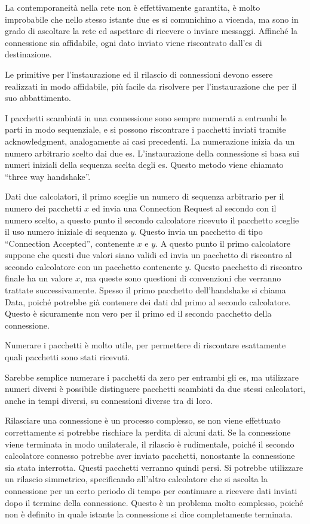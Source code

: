 \documentclass{article}
\numberwithin{equation}{subsection}
\begin{document}
La contemporaneità nella rete non è effettivamente garantita, è molto improbabile che  nello stesso istante due es si comunichino a vicenda, ma sono in grado di 
ascoltare la rete ed aspettare di ricevere o inviare messaggi. Affinché la connessione sia affidabile, ogni dato inviato viene riscontrato dall'es di destinazione. 

Le primitive per l'instaurazione ed il rilascio di connessioni devono essere realizzati in modo affidabile, più facile da risolvere per l'instaurazione che per il suo 
abbattimento. 

I pacchetti scambiati in una connessione sono sempre numerati a entrambi le parti in modo sequenziale, e si possono riscontrare i pacchetti inviati tramite 
acknowledgment, analogamente ai casi precedenti. La numerazione inizia da un numero arbitrario scelto dai due es. L'instaurazione della connessione si basa 
sui numeri iniziali della sequenza scelta degli es. Questo metodo viene chiamato ``three way handshake''. 

Dati due calcolatori, il primo sceglie un numero di sequenza arbitrario per il numero dei pacchetti $x$ ed invia una Connection Request al secondo con il numero scelto, 
a questo punto il secondo calcolatore ricevuto il pacchetto sceglie il uso numero iniziale di sequenza $y$. Questo invia un pacchetto di tipo ``Connection Accepted'', 
contenente $x$ e $y$. A questo punto il primo calcolatore suppone che questi due valori siano validi ed invia un pacchetto di riscontro al secondo calcolatore con 
un pacchetto contenente $y$. Questo pacchetto di riscontro finale ha un valore $x$, ma queste sono questioni di convenzioni che verranno trattate successivamente. Spesso 
il primo pacchetto dell'handshake si chiama Data, poiché potrebbe già contenere dei dati dal primo al secondo calcolatore. Questo è sicuramente non vero per il primo 
ed il secondo pacchetto della connessione. 


Numerare i pacchetti è molto utile, per permettere di riscontare esattamente quali pacchetti sono stati ricevuti. 

Sarebbe semplice numerare i pacchetti da zero per entrambi gli es, ma utilizzare numeri diversi è possibile distinguere pacchetti scambiati da due stessi 
calcolatori, anche in tempi diversi, su connessioni diverse tra di loro. 

Rilasciare una connessione è un processo complesso, se non viene effettuato correttamente si potrebbe rischiare la perdita di alcuni dati. Se la connessione viene 
terminata in modo unilaterale, il rilascio è rudimentale, poiché il secondo calcolatore connesso potrebbe aver inviato pacchetti, nonostante la connessione sia stata 
interrotta. Questi pacchetti verranno quindi persi. 
Si potrebbe utilizzare un rilascio simmetrico, specificando all'altro calcolatore che si ascolta la connessione per un certo periodo di tempo per continuare a ricevere 
dati inviati dopo il termine della connessione. Questo è un problema molto complesso, poiché non è definito in quale istante la connessione si dice completamente 
terminata. 
\end{document}
